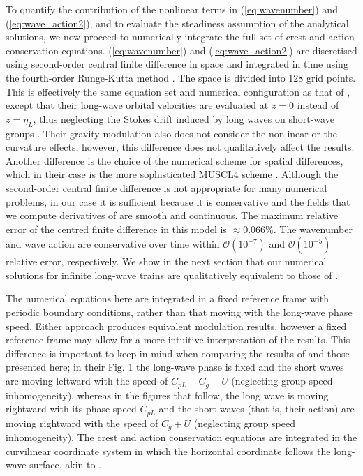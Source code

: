 \documentclass[lineno]{jfm}
\begin{document}
To quantify the contribution of the nonlinear terms in (\ref{eq:wavenumber})
and (\ref{eq:wave_action2}), and to evaluate the steadiness assumption of the
analytical solutions, we now proceed to numerically integrate the full set of
crest and action conservation equations.
(\ref{eq:wavenumber}) and (\ref{eq:wave_action2}) are discretised using
second-order central finite difference in space and integrated in time using the
fourth-order Runge-Kutta method \citep{butcher1996runge}.
The space is divided into 128 grid points.
This is effectively the same equation set and numerical configuration as that of
\citet{peureux2021unsteady}, except that their long-wave orbital velocities are
evaluated at $z=0$ instead of $z=\eta_L$, thus neglecting the Stokes drift
induced by long waves on short-wave groups
\citep{stokes1847,van2018stokes,monismith2020stokes}.
Their gravity modulation also does not consider the nonlinear or the curvature
effects, however, this difference does not qualitatively affect the results.
Another difference is the choice of the numerical scheme for spatial differences,
which in their case is the more sophisticated MUSCL4 scheme \citep{kurganov2000new}.
Although the second-order central finite difference is not appropriate for many
numerical problems, in our case it is sufficient because it is conservative and
the fields that we compute derivatives of are smooth and continuous.
The maximum relative error of the centred finite difference in this model
is $\approx 0.066\%$.
The wavenumber and wave action are conservative over time within
$\mathcal{O}(10^{-7})$ and $\mathcal{O}(10^{-5})$ relative error, respectively.
We show in the next section that our numerical solutions for infinite long-wave
trains are qualitatively equivalent to those of \citet{peureux2021unsteady}.

The numerical equations here are integrated in a fixed reference frame with
periodic boundary conditions, rather than that moving with the long-wave phase speed.
Either approach produces equivalent modulation results, however a fixed
reference frame may allow for a more intuitive interpretation of the results.
This difference is important to keep in mind when comparing the results
of \citet{peureux2021unsteady} and those presented here; in their Fig. 1 the
long-wave phase is fixed and the short waves are moving leftward
with the speed of $C_{pL} - C_g - U$ (neglecting group speed inhomogeneity),
whereas in the figures that follow, the long wave is moving rightward with its
phase speed $C_{pL}$ and the short waves (that is, their action) are moving
rightward with the speed of $C_g + U$ (neglecting group speed inhomogeneity).
The crest and action conservation equations are integrated in the curvilinear
coordinate system in which the horizontal coordinate follows the long-wave
surface, akin to \citet{zhang1990evolution}.
\end{document}
